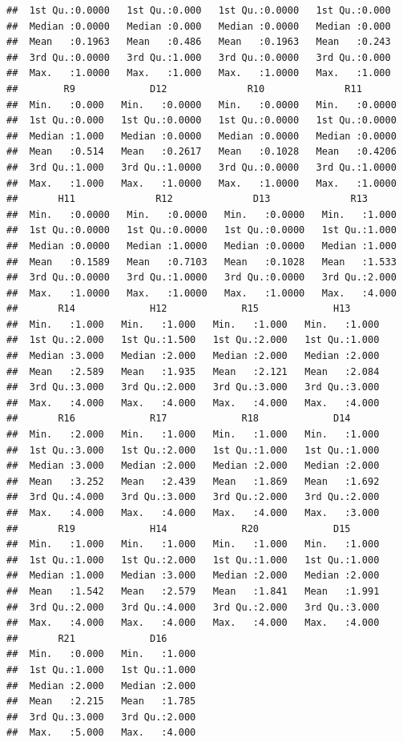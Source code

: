 \documentclass[
]{book}
\begin{document}
\begin{verbatim}
##  1st Qu.:0.0000   1st Qu.:0.000   1st Qu.:0.0000   1st Qu.:0.000  
##  Median :0.0000   Median :0.000   Median :0.0000   Median :0.000  
##  Mean   :0.1963   Mean   :0.486   Mean   :0.1963   Mean   :0.243  
##  3rd Qu.:0.0000   3rd Qu.:1.000   3rd Qu.:0.0000   3rd Qu.:0.000  
##  Max.   :1.0000   Max.   :1.000   Max.   :1.0000   Max.   :1.000  
##        R9             D12              R10              R11        
##  Min.   :0.000   Min.   :0.0000   Min.   :0.0000   Min.   :0.0000  
##  1st Qu.:0.000   1st Qu.:0.0000   1st Qu.:0.0000   1st Qu.:0.0000  
##  Median :1.000   Median :0.0000   Median :0.0000   Median :0.0000  
##  Mean   :0.514   Mean   :0.2617   Mean   :0.1028   Mean   :0.4206  
##  3rd Qu.:1.000   3rd Qu.:1.0000   3rd Qu.:0.0000   3rd Qu.:1.0000  
##  Max.   :1.000   Max.   :1.0000   Max.   :1.0000   Max.   :1.0000  
##       H11              R12              D13              R13       
##  Min.   :0.0000   Min.   :0.0000   Min.   :0.0000   Min.   :1.000  
##  1st Qu.:0.0000   1st Qu.:0.0000   1st Qu.:0.0000   1st Qu.:1.000  
##  Median :0.0000   Median :1.0000   Median :0.0000   Median :1.000  
##  Mean   :0.1589   Mean   :0.7103   Mean   :0.1028   Mean   :1.533  
##  3rd Qu.:0.0000   3rd Qu.:1.0000   3rd Qu.:0.0000   3rd Qu.:2.000  
##  Max.   :1.0000   Max.   :1.0000   Max.   :1.0000   Max.   :4.000  
##       R14             H12             R15             H13       
##  Min.   :1.000   Min.   :1.000   Min.   :1.000   Min.   :1.000  
##  1st Qu.:2.000   1st Qu.:1.500   1st Qu.:2.000   1st Qu.:1.000  
##  Median :3.000   Median :2.000   Median :2.000   Median :2.000  
##  Mean   :2.589   Mean   :1.935   Mean   :2.121   Mean   :2.084  
##  3rd Qu.:3.000   3rd Qu.:2.000   3rd Qu.:3.000   3rd Qu.:3.000  
##  Max.   :4.000   Max.   :4.000   Max.   :4.000   Max.   :4.000  
##       R16             R17             R18             D14       
##  Min.   :2.000   Min.   :1.000   Min.   :1.000   Min.   :1.000  
##  1st Qu.:3.000   1st Qu.:2.000   1st Qu.:1.000   1st Qu.:1.000  
##  Median :3.000   Median :2.000   Median :2.000   Median :2.000  
##  Mean   :3.252   Mean   :2.439   Mean   :1.869   Mean   :1.692  
##  3rd Qu.:4.000   3rd Qu.:3.000   3rd Qu.:2.000   3rd Qu.:2.000  
##  Max.   :4.000   Max.   :4.000   Max.   :4.000   Max.   :3.000  
##       R19             H14             R20             D15       
##  Min.   :1.000   Min.   :1.000   Min.   :1.000   Min.   :1.000  
##  1st Qu.:1.000   1st Qu.:2.000   1st Qu.:1.000   1st Qu.:1.000  
##  Median :1.000   Median :3.000   Median :2.000   Median :2.000  
##  Mean   :1.542   Mean   :2.579   Mean   :1.841   Mean   :1.991  
##  3rd Qu.:2.000   3rd Qu.:4.000   3rd Qu.:2.000   3rd Qu.:3.000  
##  Max.   :4.000   Max.   :4.000   Max.   :4.000   Max.   :4.000  
##       R21             D16       
##  Min.   :0.000   Min.   :1.000  
##  1st Qu.:1.000   1st Qu.:1.000  
##  Median :2.000   Median :2.000  
##  Mean   :2.215   Mean   :1.785  
##  3rd Qu.:3.000   3rd Qu.:2.000  
##  Max.   :5.000   Max.   :4.000
\end{verbatim}
\end{document}
